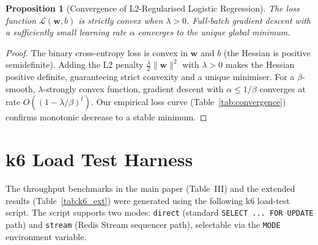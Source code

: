 \documentclass[11pt]{article}
\newtheorem{proposition}[theorem]{Proposition}
\begin{document}
\begin{proposition}[Convergence of L2-Regularised Logistic Regression]
The loss function $\mathcal{L}(\mathbf{w}, b)$ is strictly convex when
$\lambda > 0$. Full-batch gradient descent with a sufficiently small
learning rate $\alpha$ converges to the unique global minimum.
\end{proposition}

\begin{proof}
The binary cross-entropy loss is convex in $\mathbf{w}$ and $b$ (the
Hessian is positive semidefinite). Adding the L2 penalty
$\frac{\lambda}{2}\|\mathbf{w}\|^2$ with $\lambda > 0$ makes the
Hessian positive definite, guaranteeing strict convexity and a unique
minimiser. For a $\beta$-smooth, $\lambda$-strongly convex function,
gradient descent with $\alpha \leq 1/\beta$ converges at rate
$O((1 - \lambda/\beta)^t)$. Our empirical loss curve
(Table~\ref{tab:convergence}) confirms monotonic decrease to a stable
minimum.
\end{proof}

\section{k6 Load Test Harness}
\label{sec:k6}

The throughput benchmarks in the main paper (Table~III) and the extended
results (Table~\ref{tab:k6_ext}) were generated using the following k6
load-test script. The script supports two modes: \texttt{direct} (standard
\texttt{SELECT ... FOR UPDATE} path) and \texttt{stream} (Redis Stream
sequencer path), selectable via the \texttt{MODE} environment variable.
\end{document}
